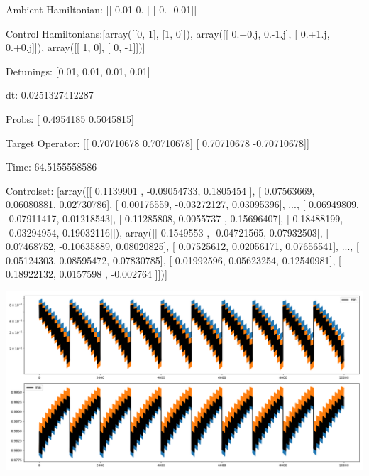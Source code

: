 \documentclass{article}
\begin{document}
    

\newpage

Ambient Hamiltonian: [[ 0.01  0.  ]
 [ 0.   -0.01]]

Control Hamiltonians:[array([[0, 1],
       [1, 0]]), array([[ 0.+0.j,  0.-1.j],
       [ 0.+1.j,  0.+0.j]]), array([[ 1,  0],
       [ 0, -1]])]

Detunings: [0.01, 0.01, 0.01, 0.01]

 dt: 0.0251327412287

Probs: [ 0.4954185  0.5045815]

Target Operator: [[ 0.70710678  0.70710678]
 [ 0.70710678 -0.70710678]]

Time: 64.5155558586

Controlset: [array([[ 0.1139901 , -0.09054733,  0.1805454 ],
       [ 0.07563669,  0.06080881,  0.02730786],
       [ 0.00176559, -0.03272127,  0.03095396],
       ..., 
       [ 0.06949809, -0.07911417,  0.01218543],
       [ 0.11285808,  0.0055737 ,  0.15696407],
       [ 0.18488199, -0.03294954,  0.19032116]]), array([[ 0.1549553 , -0.04721565,  0.07932503],
       [ 0.07468752, -0.10635889,  0.08020825],
       [ 0.07525612,  0.02056171,  0.07656541],
       ..., 
       [ 0.05124303,  0.08595472,  0.07830785],
       [ 0.01992596,  0.05623254,  0.12540981],
       [ 0.18922132,  0.0157598 , -0.002764  ]])]
\begin{center}
\includegraphics[scale=.9]{control_dpn_all.png}

\end{center}
\end{document}
